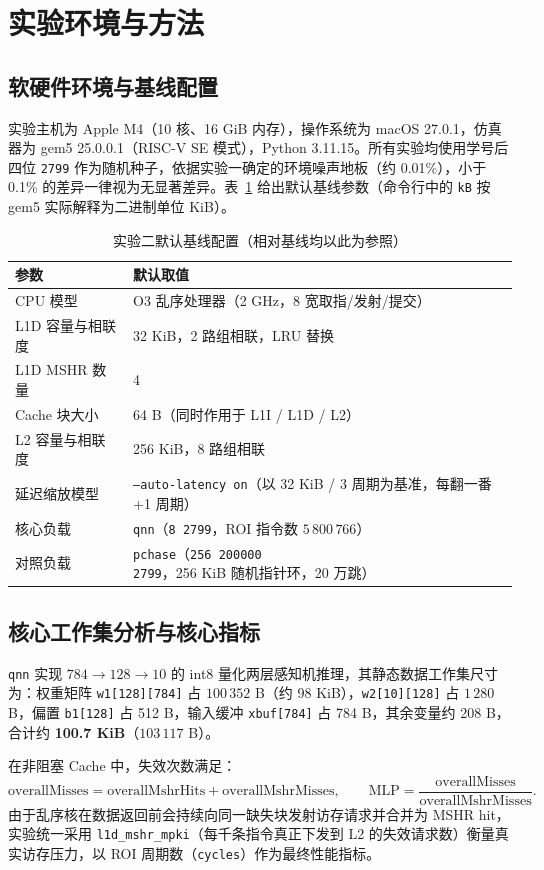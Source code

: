 \documentclass[12pt,a4paper,fontset=mac]{ctexart}
\begin{document}
\section{实验环境与方法}
\subsection{软硬件环境与基线配置}
实验主机为 Apple M4（10 核、16 GiB 内存），操作系统为 macOS 27.0.1，仿真器为 gem5 25.0.0.1（RISC-V SE 模式），Python 3.11.15。所有实验均使用学号后四位 \texttt{2799} 作为随机种子，依据实验一确定的环境噪声地板（约 0.01\%），小于 0.1\% 的差异一律视为无显著差异。表~\ref{tab:baseline} 给出默认基线参数（命令行中的 \texttt{kB} 按 gem5 实际解释为二进制单位 KiB）。

\begin{table}[H]\centering\small
\caption{实验二默认基线配置（相对基线均以此为参照）}\label{tab:baseline}
\begin{tabular}{ll}\toprule
参数 & 默认取值 \\\midrule
CPU 模型 & O3 乱序处理器（2 GHz，8 宽取指/发射/提交） \\
L1D 容量与相联度 & 32 KiB，2 路组相联，LRU 替换 \\
L1D MSHR 数量 & 4 \\
Cache 块大小 & 64 B（同时作用于 L1I / L1D / L2） \\
L2 容量与相联度 & 256 KiB，8 路组相联 \\
延迟缩放模型 & \texttt{--auto-latency on}（以 32 KiB / 3 周期为基准，每翻一番 +1 周期） \\
核心负载 & \texttt{qnn}（\texttt{8 2799}，ROI 指令数 $5\,800\,766$） \\
对照负载 & \texttt{pchase}（\texttt{256 200000 2799}，256 KiB 随机指针环，20 万跳） \\
\bottomrule\end{tabular}
\end{table}

\subsection{核心工作集分析与核心指标}
\texttt{qnn} 实现 $784\to128\to10$ 的 int8 量化两层感知机推理，其静态数据工作集尺寸为：权重矩阵 \texttt{w1[128][784]} 占 $100\,352$ B（约 98 KiB），\texttt{w2[10][128]} 占 $1\,280$ B，偏置 \texttt{b1[128]} 占 512 B，输入缓冲 \texttt{xbuf[784]} 占 784 B，其余变量约 208 B，合计约 \textbf{100.7 KiB}（$103\,117$ B）。

在非阻塞 Cache 中，失效次数满足：
\begin{equation}
\mathrm{overallMisses} = \mathrm{overallMshrHits} + \mathrm{overallMshrMisses}, \qquad
\mathrm{MLP} = \frac{\mathrm{overallMisses}}{\mathrm{overallMshrMisses}}.
\end{equation}
由于乱序核在数据返回前会持续向同一缺失块发射访存请求并合并为 MSHR hit，实验统一采用 \texttt{l1d\_mshr\_mpki}（每千条指令真正下发到 L2 的失效请求数）衡量真实访存压力，以 ROI 周期数（\texttt{cycles}）作为最终性能指标。
\end{document}
